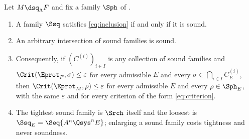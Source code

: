 
\begin{corollary}
\label{cor:sound}
Let $M\dsq_{\Lambda}F$ and fix a family $\Sph$ of .
\begin{enumerate}[label=(\roman*),leftmargin=3.0em]
\item A family $\Ssq$ satisfies \eqref{eq:inclusion} if and only if it is
  sound.
\item An arbitrary intersection of sound families is sound.
\item Consequently, if $(C^{(i)})_{i\in I}$ is any collection of sound families
  and $\Crit(\Eprot_F,\sigma)\le\varepsilon$ for every admissible $E$ and every
  $\sigma\in\bigcap_{i\in I}C^{(i)}_E$, then $\Crit(\Eprot_M,\rho)\le
  \varepsilon$ for every admissible $E$ and every $\rho\in\Sph_E$, with the
  same $\varepsilon$ and for every criterion of the form \eqref{eq:criterion}.
\item The tightest sound family is $\Srch$ itself and the loosest is
  $\Ssq_E=\Seq{A^{n}\Qsys^{n}E}$; enlarging a sound family costs tightness and
  never soundness.
\end{enumerate}
\end{corollary}

